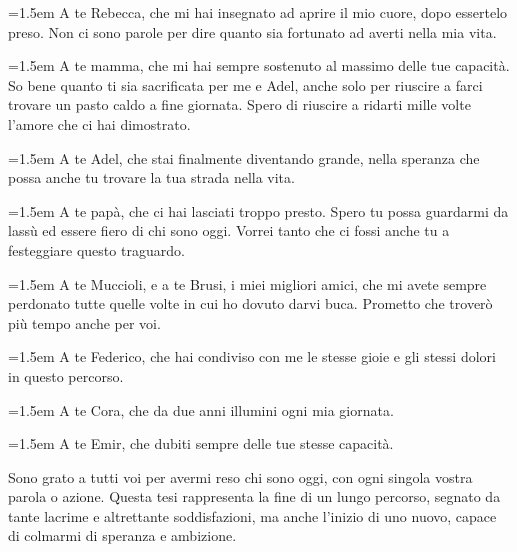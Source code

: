 \documentclass[12pt,a4paper,openright,twoside]{book}
\begin{document}



\backmatter




\begin{acknowledgements}

\setlength{\parindent}{0pt}
\setlength{\parskip}{0.3em}

\hangindent=1.5em A te Rebecca, che mi hai insegnato ad aprire il mio cuore, dopo essertelo preso. Non ci sono parole per dire quanto sia fortunato ad averti nella mia vita.

\hangindent=1.5em A te mamma, che mi hai sempre sostenuto al massimo delle tue capacità. So bene quanto ti sia sacrificata per me e Adel, anche solo per riuscire a farci trovare un pasto caldo a fine giornata. Spero di riuscire a ridarti mille volte l'amore che ci hai dimostrato.

\hangindent=1.5em A te Adel, che stai finalmente diventando grande, nella speranza che possa anche tu trovare la tua strada nella vita.

\hangindent=1.5em A te papà, che ci hai lasciati troppo presto. Spero tu possa guardarmi da lassù ed essere fiero di chi sono oggi. Vorrei tanto che ci fossi anche tu a festeggiare questo traguardo.

\hangindent=1.5em A te Muccioli, e a te Brusi, i miei migliori amici, che mi avete sempre perdonato tutte quelle volte in cui ho dovuto darvi buca. Prometto che troverò più tempo anche per voi.

\hangindent=1.5em A te Federico, che hai condiviso con me le stesse gioie e gli stessi dolori in questo percorso.

\hangindent=1.5em A te Cora, che da due anni illumini ogni mia giornata.

\hangindent=1.5em A te Emir, che dubiti sempre delle tue stesse capacità.

\vspace{1.5em}
Sono grato a tutti voi per avermi reso chi sono oggi, con ogni singola vostra parola o azione. Questa tesi rappresenta la fine di un lungo percorso, segnato da tante lacrime e altrettante soddisfazioni, ma anche l'inizio di uno nuovo, capace di colmarmi di speranza e ambizione.

\end{acknowledgements}
\end{document}
